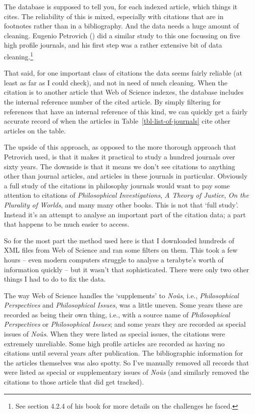 \documentclass[
  12pt,
  letterpaper,
  DIV=11,
  numbers=noendperiod]{scrartcl}
\begin{document}
The database is supposed to tell you, for each indexed article, which
things it cites. The reliability of this is mixed, especially with
citations that are in footnotes rather than in a bibliography. And the
data needs a huge amount of cleaning. Eugenio Petrovich
() did a similar study to this one
focussing on five high profile journals, and his first step was a rather
extensive bit of data cleaning.\footnote{See section 4.2.4 of his book
  for more details on the challenges he faced.}

That said, for one important class of citations the data seems fairly
reliable (at least as far as I could check), and not in need of much
cleaning. When the citation is to another article that Web of Science
indexes, the database includes the internal reference number of the
cited article. By simply filtering for references that have an internal
reference of this kind, we can quickly get a fairly accurate record of
when the articles in Table~\ref{tbl-list-of-journals} cite other
articles on the table.

The upside of this approach, as opposed to the more thorough approach
that Petrovich used, is that it makes it practical to study a hundred
journals over sixty years. The downside is that it means we don't see
citations to anything other than journal articles, and articles in these
journals in particular. Obviously a full study of the citations in
philosophy journals would want to pay some attention to citations of
\emph{Philosophical Investigations}, \emph{A Theory of Justice},
\emph{On the Plurality of Worlds}, and many many other books. This is
not that `full study'. Instead it's an attempt to analyse an important
part of the citation data; a part that happens to be much easier to
access.

So for the most part the method used here is that I downloaded hundreds
of XML files from Web of Science and ran some filters on them. This took
a few hours -- even modern computers struggle to analyse a terabyte's
worth of information quickly -- but it wasn't that sophisticated. There
were only two other things I had to do to fix the data.

The way Web of Science handles the `supplements' to \emph{Noûs}, i.e.,
\emph{Philosophical Perspectives} and \emph{Philosophical Issues}, was a
little uneven. Some years these are recorded as being their own thing,
i.e., with a source name of \emph{Philosophical Perspectives} or
\emph{Philosophical Issues}; and some years they are recorded as special
issues of \emph{Noûs}. When they were listed as special issues, the
citations were extremely unreliable. Some high profile articles are
recorded as having no citations until several years after publication.
The bibliographic information for the articles themselves was also
spotty. So I've manually removed all records that were listed as special
or supplementary issues of \emph{Noûs} (and similarly removed the
citations to those article that did get tracked).
\end{document}
